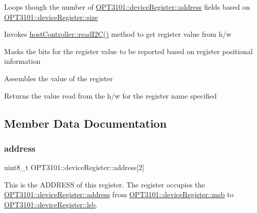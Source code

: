 \begin{DoxyItemize}
\item Loops though the number of \mbox{\hyperlink{class_o_p_t3101_1_1device_register_a81d25c717489ac388db0fed33c35bedd}{O\+P\+T3101\+::device\+Register\+::address}} fields based on \mbox{\hyperlink{class_o_p_t3101_1_1device_register_a058d48b4c23e22739b1c65d85367a0a8}{O\+P\+T3101\+::device\+Register\+::size}}
\item Invokes \mbox{\hyperlink{classhost_controller_a2bee6b3ec45fac241484f7dad943d8ed}{host\+Controller\+::read\+I2\+C()}} method to get register value from h/w
\item Masks the bits for the register value to be reported based on register positional information
\item Assembles the value of the register
\item Returns the value read from the h/w for the register name specified 
\end{DoxyItemize}

\subsection{Member Data Documentation}
\mbox{\label{class_o_p_t3101_1_1device_register_a81d25c717489ac388db0fed33c35bedd}} 
\subsubsection{\texorpdfstring{address}{address}}
{\footnotesize\ttfamily uint8\+\_\+t O\+P\+T3101\+::device\+Register\+::address\mbox{[}2\mbox{]}}



This is the A\+D\+D\+R\+E\+SS of this register. The register occupies the \mbox{\hyperlink{class_o_p_t3101_1_1device_register_a81d25c717489ac388db0fed33c35bedd}{O\+P\+T3101\+::device\+Register\+::address}} from \mbox{\hyperlink{class_o_p_t3101_1_1device_register_a40f9e71d804ae858b6baed1f12b3cf83}{O\+P\+T3101\+::device\+Register\+::msb}} to \mbox{\hyperlink{class_o_p_t3101_1_1device_register_a404078f369116e10b1cccfbb77c557ca}{O\+P\+T3101\+::device\+Register\+::lsb}}. 

\mbox{\label{class_o_p_t3101_1_1device_register_a404078f369116e10b1cccfbb77c557ca}} 
